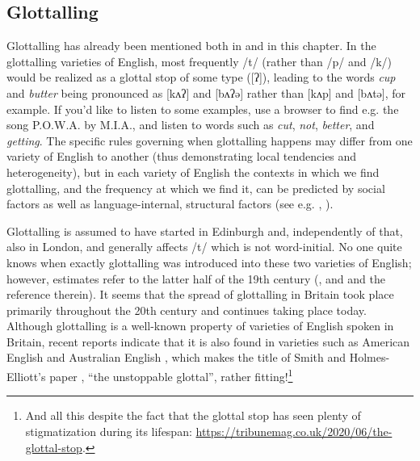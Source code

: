\subsection{Glottalling}
\largerpage
Glottalling has already been mentioned both in  and in this chapter. In the glottalling varieties of English, most frequently /t/ (rather than /p/ and /k/) would be realized as a glottal stop of some type ([ʔ]), leading to the words \emph{cup} and \emph{butter} being pronounced as [kʌʔ] and [bʌʔə] rather than [kʌp] and [bʌtə], for example. If you'd like to listen to some examples, use a browser to find e.g. the song P.O.W.A. by M.I.A., and listen to words such as \textit{cut}, \textit{not}, \textit{better}, and \textit{getting}. The specific rules governing when glottalling happens may differ from one variety of English to another (thus demonstrating local tendencies and heterogeneity), but in each variety of English the contexts in which we find glottalling, and the frequency at which we find it, can be predicted by social factors as well as language-internal, structural factors (see e.g. \citealp{Schleef2013}, \citealp{SmithHolmes-Elliott2017}).

Glottalling is assumed to have started in Edinburgh and, independently of that, also in London, and generally affects /t/ which is not word-initial. No one quite knows when exactly glottalling was introduced into these two varieties of English; however, estimates refer to the latter half of the 19th century (\citealp[208--209]{Beal2004}, and \citealp{Schleef2013} and the reference therein). It seems that the spread of glottalling in Britain took place primarily throughout the 20th century and continues taking place today. Although glottalling is a well-known property of varieties of English spoken in Britain, recent reports indicate that it is also found in varieties such as American English \citep{EddingtonTaylor2009} and Australian English \citep[342--3]{CoxPalethorpe2007}, which makes the title of Smith and Holmes-Elliott's paper \citeyearpar{SmithHolmes-Elliott2017}, ``the unstoppable glottal'', rather fitting!\footnote{And all this despite the fact that the glottal stop has seen plenty of stigmatization during its lifespan: \url{https://tribunemag.co.uk/2020/06/the-glottal-stop}.}

